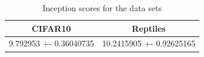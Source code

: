 \begin{table}[]
\centering
\caption{Inception scores for the data sets}
\label{table:GS}
\begin{tabular}{c|c}
CIFAR10                   & Reptiles                    \\ \hline
9.792953 +- 0.36040735 & 10.2415905 +- 0.92625165
\end{tabular}
\end{table}


